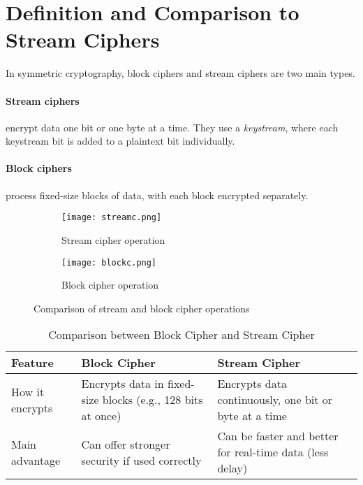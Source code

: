 \section{Definition and Comparison to Stream Ciphers}

In symmetric cryptography, block ciphers and stream ciphers are two main types.

\paragraph{Stream ciphers} encrypt data one bit or one byte at a time. 
They use a \textit{keystream}, where each keystream bit is added to a plaintext bit individually.

\paragraph{Block ciphers} process fixed-size blocks of data, with each block encrypted separately.


\begin{figure}[h]
    \centering
    \begin{subfigure}[b]{0.45\textwidth}
        \centering
        \texttt{[image: streamc.png]}
        \caption{Stream cipher operation}
        \label{fig:stream_cipher}
    \end{subfigure}
    \hfill
    \begin{subfigure}[b]{0.45\textwidth}
        \centering
        \texttt{[image: blockc.png]}
        \caption{Block cipher operation}
        \label{fig:block_cipher}
    \end{subfigure}
    \caption{Comparison of stream and block cipher operations}
    \label{fig:cipher_comparison}
\end{figure}



\begin{table}[h]
    \centering
    \begin{tabular}{|l|l|l|}
    \hline
    \textbf{Feature} & \textbf{Block Cipher} & \textbf{Stream Cipher} \\ \hline
    How it encrypts & Encrypts data in fixed-size blocks (e.g., 128 bits at once) & Encrypts data continuously, one bit or byte at a time \\ \hline
    Main advantage & Can offer stronger security if used correctly & Can be faster and better for real-time data (less delay) \\ \hline
    \end{tabular}
    \caption{Comparison between Block Cipher and Stream Cipher}
    \label{tab:block_stream_comparison}
    \end{table}